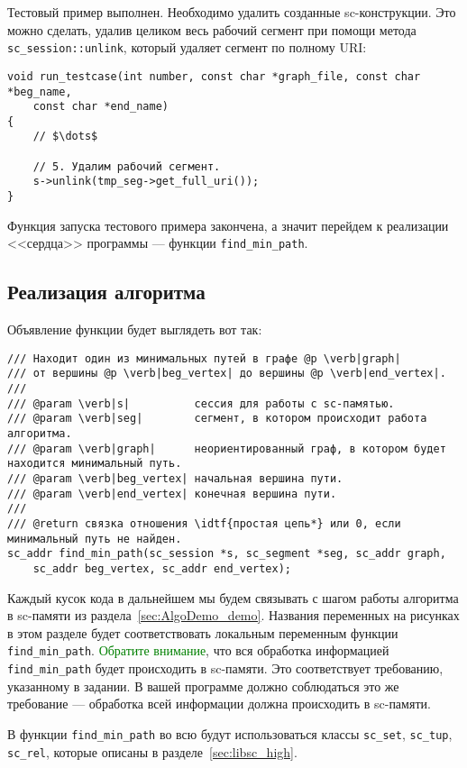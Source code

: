 Тестовый пример выполнен. Необходимо удалить созданные
sc-конструкции. Это можно сделать, удалив целиком весь рабочий сегмент
при помощи метода \lstinline|sc_session::unlink|, который удаляет
сегмент по полному URI:
\begin{lstlisting}[texcl]
void run_testcase(int number, const char *graph_file, const char *beg_name,
    const char *end_name)
{
    // $\dots$

    // 5. Удалим рабочий сегмент.
    s->unlink(tmp_seg->get_full_uri());
}
\end{lstlisting}

Функция запуска тестового примера закончена, а значит перейдем к
реализации <<сердца>> программы --- функции \lstinline|find_min_path|.

\subsection{Реализация алгоритма}
\label{sec:libscprg_find_min_path}

Объявление функции будет выглядеть вот так:
\begin{lstlisting}[texcl]
/// Находит один из минимальных путей в графе @p \verb|graph|
/// от вершины @p \verb|beg_vertex| до вершины @p \verb|end_vertex|.
///
/// @param \verb|s|          сессия для работы с sc-памятью.
/// @param \verb|seg|        сегмент, в котором происходит работа алгоритма.
/// @param \verb|graph|      неориентированный граф, в котором будет находится минимальный путь.
/// @param \verb|beg_vertex| начальная вершина пути.
/// @param \verb|end_vertex| конечная вершина пути.
///
/// @return связка отношения \idtf{простая цепь*} или 0, если минимальный путь не найден.
sc_addr find_min_path(sc_session *s, sc_segment *seg, sc_addr graph,
    sc_addr beg_vertex, sc_addr end_vertex);
\end{lstlisting}

Каждый кусок кода в дальнейшем мы будем связывать с шагом работы
алгоритма в sc-памяти из раздела~\ref{sec:AlgoDemo_demo}. Названия
переменных на рисунках в этом разделе будет соответствовать локальным
переменным функции
\lstinline|find_min_path|. \textcolor{green}{Обратите внимание}, что
вся обработка информацией \lstinline|find_min_path| будет происходить
в sc-памяти. Это соответствует требованию, указанному в задании. В
вашей программе должно соблюдаться это же требование --- обработка
всей информации должна происходить в sc-памяти.

В функции \lstinline|find_min_path| во всю будут использоваться классы
\lstinline|sc_set|, \lstinline|sc_tup|, \lstinline|sc_rel|, которые
описаны в разделе~\ref{sec:libsc_high}.

